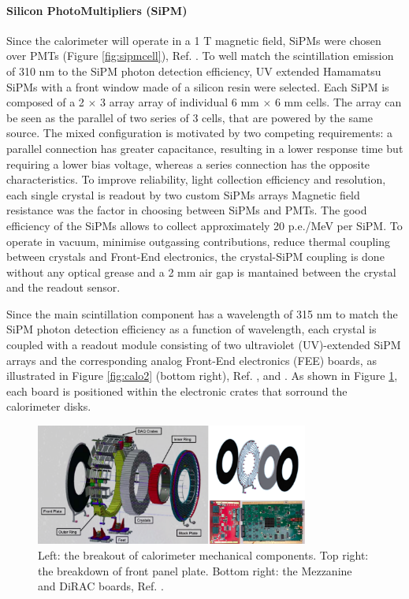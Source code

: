 \paragraph{Silicon PhotoMultipliers (SiPM)}
Since the calorimeter will operate in a 1 T magnetic field, SiPMs were chosen over PMTs (Figure \ref{fig:sipmcell}), Ref. \cite{em1}. 
To well match the scintillation emission of 310 nm to the SiPM photon detection efficiency, 
UV extended Hamamatsu SiPMs with a front window made of a silicon resin were selected. Each SiPM is composed of a
2 $\times$ 3 array array of individual 6 mm $\times$ 6 mm cells.
The array can be seen as the parallel of two series of 3 cells, that 
are powered by the same source. The mixed configuration is motivated by 
two competing requirements: a parallel connection has greater capacitance, 
resulting in a lower response time but requiring a lower bias voltage, whereas 
a series connection has the opposite characteristics. 
To improve reliability, light collection efficiency and resolution, each single 
crystal is readout by two custom SiPMs arrays
Magnetic field resistance was the factor in choosing between SiPMs and PMTs.
The good efficiency of the SiPMs allows to collect approximately 20 p.e./MeV per SiPM.
To operate in vacuum, minimise outgassing contributions, reduce 
thermal coupling between crystals and Front-End electronics, the crystal-SiPM 
coupling is done without any optical grease and a 2 mm air gap is mantained 
between the crystal and the readout sensor.

Since the main scintillation component has a wavelength of 315 nm to match the SiPM
photon detection efficiency as a function of wavelength, each crystal is coupled with a readout 
module consisting of two ultraviolet (UV)-extended SiPM arrays
and the corresponding analog Front-End electronics (FEE) boards, as illustrated in Figure 
\ref{fig:calo2} (bottom right), Ref. \cite{em5}, \cite{em2} and \cite{em3}. 
As shown in Figure \ref{fig:calo3}, each board is positioned within the electronic 
crates that sorround the calorimeter disks.
\begin{figure}[!h]
        \centering
        \includegraphics[width =0.8\textwidth]{figures/png/Screenshot_20240322_121017.png}
        \caption[The breakout of calorimeter mechanical components.]{Left: the breakout of calorimeter mechanical components. Top right: the breakdown of front
        panel plate. Bottom right: the Mezzanine and DiRAC boards, Ref. \cite{em4}.}
        \label{fig:calo3}
        \end{figure}


